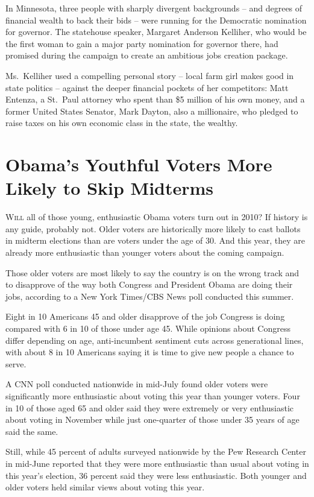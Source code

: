 ﻿\documentclass[12pt]{article}
\begin{document}
In Minnesota, three people with sharply divergent backgrounds -- and degrees of financial wealth to
back their bids -- were running for the Democratic nomination for governor. The statehouse speaker,
Margaret Anderson Kelliher, who would be the first woman to gain a major party nomination for
governor there, had promised during the campaign to create an ambitious jobs creation package.

Ms.~Kelliher used a compelling personal story -- local farm girl makes good in state politics --
against the deeper financial pockets of her competitors: Matt Entenza, a St.~Paul attorney who spent
than \$5 million of his own money, and a former United States Senator, Mark Dayton, also a
millionaire, who pledged to raise taxes on his own economic class in the state, the wealthy.

\section{Obama's Youthful Voters More Likely to Skip Midterms}

\lettrine{W}{ill} all of those young, enthusiastic Obama voters turn out in
2010? If history is any guide, probably not. Older voters are historically more likely to cast
ballots in midterm elections than are voters under the age of 30. And this year, they are already
more enthusiastic than younger voters about the coming campaign.

Those older voters are most likely to say the country is on the wrong track and to disapprove of the
way both Congress and President Obama are doing their jobs, according to a New York Times/CBS News
poll conducted this summer.

Eight in 10 Americans 45 and older disapprove of the job Congress is doing compared with 6 in 10 of
those under age 45. While opinions about Congress differ depending on age, anti-incumbent sentiment
cuts across generational lines, with about 8 in 10 Americans saying it is time to give new people a
chance to serve.

A CNN poll conducted nationwide in mid-July found older voters were significantly more enthusiastic
about voting this year than younger voters. Four in 10 of those aged 65 and older said they were
extremely or very enthusiastic about voting in November while just one-quarter of those under 35
years of age said the same.

Still, while 45 percent of adults surveyed nationwide by the Pew Research Center in mid-June
reported that they were more enthusiastic than usual about voting in this year's election, 36
percent said they were less enthusiastic. Both younger and older voters held similar views about
voting this year.
\end{document}

